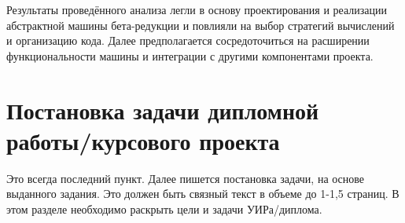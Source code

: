 Результаты проведённого анализа легли в основу проектирования и реализации абстрактной машины бета-редукции и повлияли на выбор стратегий вычислений и организацию кода. Далее предполагается сосредоточиться на расширении функциональности машины и интеграции с другими компонентами проекта.



\section{Постановка задачи дипломной работы/курсового проекта}

Это всегда последний пункт. Далее пишется постановка задачи, на основе выданного задания. Это должен быть связный текст в объеме до 1-1,5 страниц. В этом разделе необходимо раскрыть цели и задачи УИРа/диплома. 

